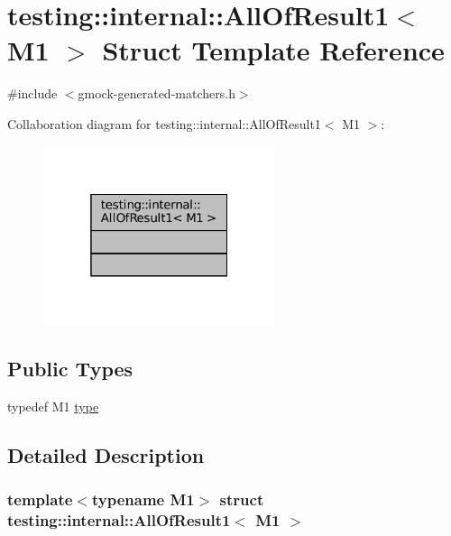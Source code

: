 \hypertarget{structtesting_1_1internal_1_1AllOfResult1}{}\section{testing\+:\+:internal\+:\+:All\+Of\+Result1$<$ M1 $>$ Struct Template Reference}
\label{structtesting_1_1internal_1_1AllOfResult1}


{\ttfamily \#include $<$gmock-\/generated-\/matchers.\+h$>$}



Collaboration diagram for testing\+:\+:internal\+:\+:All\+Of\+Result1$<$ M1 $>$\+:
\nopagebreak
\begin{figure}[H]
\begin{center}
\leavevmode
\includegraphics[width=193pt]{structtesting_1_1internal_1_1AllOfResult1__coll__graph}
\end{center}
\end{figure}
\subsection*{Public Types}
\begin{DoxyCompactItemize}
\item 
typedef M1 \hyperlink{structtesting_1_1internal_1_1AllOfResult1_a19b95d4ddf7f4044a78665d9e253db10}{type}
\end{DoxyCompactItemize}


\subsection{Detailed Description}
\subsubsection*{template$<$typename M1$>$\newline
struct testing\+::internal\+::\+All\+Of\+Result1$<$ M1 $>$}




